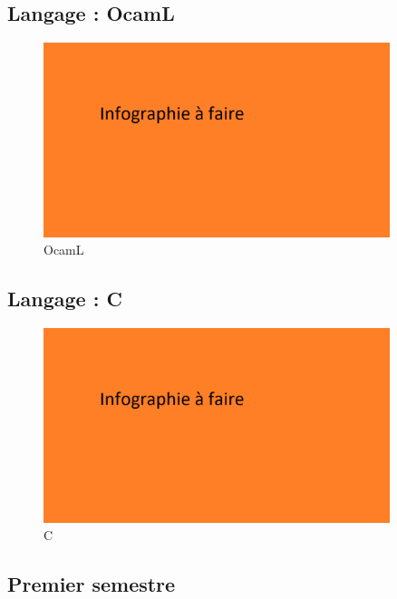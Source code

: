 \documentclass[aspectratio=169]{beamer}
\begin{document}
\subsection{Langage : OcamL}

\begin{frame}
    \begin{figure}
        \centering
        \includegraphics[width=0.9\textwidth]{ressource_diapo/place older.png}
        \caption{OcamL}
    \end{figure}
\end{frame}

\subsection{Langage : C}

\begin{frame}
    \begin{figure}
        \centering
        \includegraphics[width=0.9\textwidth]{ressource_diapo/place older.png}
        \caption{C}
    \end{figure}
\end{frame}

\subsection{Premier semestre}
\end{document}
